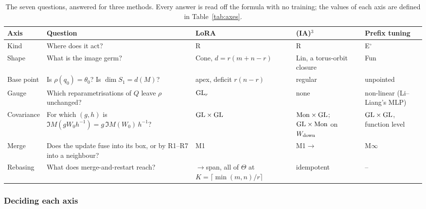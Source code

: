 \begin{table}[t]
\centering\footnotesize
\caption{The seven questions, answered for three methods. Every answer is read off the formula with no training; the
values of each axis are defined in Table~\ref{tab:axes}.}\label{tab:axes-examples}
\begin{tabularx}{\linewidth}{@{}>{\raggedright\arraybackslash}p{2.0cm}>{\raggedright\arraybackslash}X%
>{\raggedright\arraybackslash}p{2.9cm}>{\raggedright\arraybackslash}p{2.5cm}>{\raggedright\arraybackslash}p{2.25cm}@{}}
\toprule\headrow
\textbf{Axis} & \textbf{Question} & \textbf{LoRA} & \textbf{(IA)$^3$} & \textbf{Prefix tuning}\\\midrule
1\enspace Kind & Where does it act? & R & R & E$^\circ$\\
2\enspace Shape & What is the image germ? & Cone, $d=r(m+n-r)$ & Lin, a torus-orbit closure & Fun\\
3\enspace Base point & Is $\rho(q_0)=\theta_0$? Is $\dim S_1=d(M)$? & apex, deficit $r(n-r)$ & regular & unpointed\\
4\enspace Gauge & Which reparametrisations of $Q$ leave $\rho$ unchanged? & $\mathrm{GL}_r$ & none & non-linear (Li--Liang's
MLP)\\
5\enspace Covariance & For which $(g,h)$ is $\Im M(gW_0h^{-1})=g\,\Im M(W_0)\,h^{-1}$? & $\mathrm{GL}\times\mathrm{GL}$ &
$\mathrm{Mon}\times\mathrm{GL}$; $\mathrm{GL}\times\mathrm{Mon}$ on $W_{\rm down}$ & $\mathrm{GL}\times\mathrm{GL}$, function level\\
6\enspace Merge & Does the update fuse into its box, or by R1--R7 into a neighbour? & M1 & M1$\to$ & M$\infty$\\
7\enspace Rebasing & What does merge-and-restart reach? & $\to$span, all of $\Theta$ at $K=\lceil\min(m,n)/r\rceil$ &
idempotent & --\\
\bottomrule
\end{tabularx}
\end{table}

\subsubsection{Deciding each axis}\label{sec:atlas-decide}

